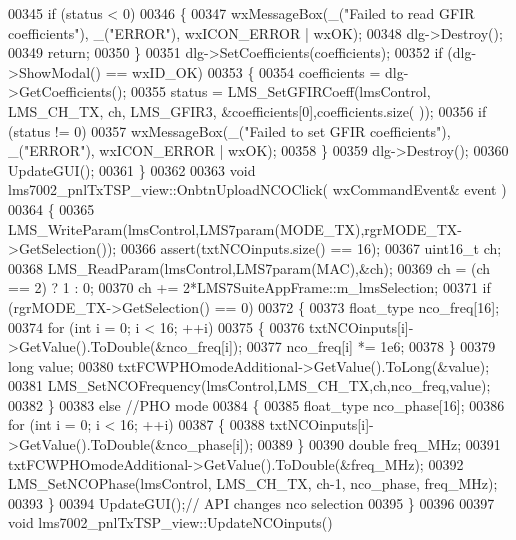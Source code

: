 \begin{DoxyCode}
{{{{{{00345     \textcolor{keywordflow}{if} (status < 0)
00346     \{
00347         wxMessageBox(\_(\textcolor{stringliteral}{"Failed to read GFIR coefficients"}), \_(\textcolor{stringliteral}{"ERROR"}), wxICON\_ERROR | wxOK);
00348         dlg->Destroy();
00349         \textcolor{keywordflow}{return};
00350     \}
00351     dlg->SetCoefficients(coefficients);
00352     \textcolor{keywordflow}{if} (dlg->ShowModal() == wxID\_OK)
00353     \{
00354         coefficients = dlg->GetCoefficients();
00355         status = LMS_SetGFIRCoeff(lmsControl, LMS_CH_TX, ch, LMS_GFIR3, &coefficients[0],coefficients.size(
      ));
00356         \textcolor{keywordflow}{if} (status != 0)
00357             wxMessageBox(\_(\textcolor{stringliteral}{"Failed to set GFIR coefficients"}), \_(\textcolor{stringliteral}{"ERROR"}), wxICON\_ERROR | wxOK);
00358     \}
00359     dlg->Destroy();
00360     UpdateGUI();
00361 \}
00362 
00363 \textcolor{keywordtype}{void} lms7002_pnlTxTSP_view::OnbtnUploadNCOClick( wxCommandEvent& event )
00364 \{
00365     LMS_WriteParam(lmsControl,LMS7param(MODE_TX),rgrMODE_TX->GetSelection());
00366     assert(txtNCOinputs.size() == 16);
00367     uint16\_t ch;
00368     LMS_ReadParam(lmsControl,LMS7param(MAC),&ch);
00369     ch = (ch == 2) ? 1 : 0;
00370     ch += 2*LMS7SuiteAppFrame::m_lmsSelection;
00371     \textcolor{keywordflow}{if} (rgrMODE_TX->GetSelection() == 0)
00372     \{
00373         float_type nco\_freq[16];
00374         \textcolor{keywordflow}{for} (\textcolor{keywordtype}{int} i = 0; i < 16; ++i)
00375         \{
00376             txtNCOinputs[i]->GetValue().ToDouble(&nco\_freq[i]);
00377             nco\_freq[i] *= 1e6;
00378         \}
00379         \textcolor{keywordtype}{long} value;
00380         txtFCWPHOmodeAdditional->GetValue().ToLong(&value);
00381         LMS_SetNCOFrequency(lmsControl,LMS_CH_TX,ch,nco\_freq,value);
00382     \}
00383     \textcolor{keywordflow}{else} \textcolor{comment}{//PHO mode}
00384     \{
00385         float_type nco\_phase[16];
00386         \textcolor{keywordflow}{for} (\textcolor{keywordtype}{int} i = 0; i < 16; ++i)
00387         \{
00388             txtNCOinputs[i]->GetValue().ToDouble(&nco\_phase[i]);
00389         \}
00390         \textcolor{keywordtype}{double} freq\_MHz;
00391         txtFCWPHOmodeAdditional->GetValue().ToDouble(&freq\_MHz);
00392         LMS_SetNCOPhase(lmsControl, LMS_CH_TX, ch-1, nco\_phase, freq\_MHz);
00393     \}
00394     UpdateGUI();\textcolor{comment}{// API changes nco selection}
00395 \}
00396 
00397 \textcolor{keywordtype}{void} lms7002_pnlTxTSP_view::UpdateNCOinputs()
}}}}}}
\end{DoxyCode}
